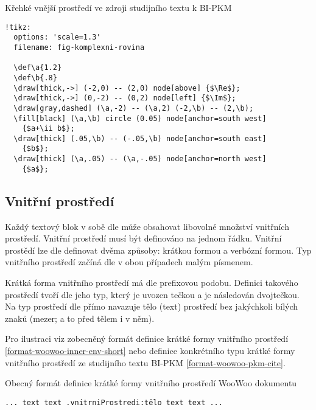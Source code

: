 \begin{listing}
    \caption{Křehké vnější prostředí ve zdroji studijního textu k BI-PKM~\cite{pkm}}
    \label{format-woowoo-pkm-tikz}
    \begin{verbatim}
!tikz:
  options: 'scale=1.3'
  filename: fig-komplexni-rovina

  \def\a{1.2}
  \def\b{.8}
  \draw[thick,->] (-2,0) -- (2,0) node[above] {$\Re$};
  \draw[thick,->] (0,-2) -- (0,2) node[left] {$\Im$};
  \draw[gray,dashed] (\a,-2) -- (\a,2) (-2,\b) -- (2,\b);
  \fill[black] (\a,\b) circle (0.05) node[anchor=south west]
    {$a+\ii b$};
  \draw[thick] (.05,\b) -- (-.05,\b) node[anchor=south east]
    {$b$};
  \draw[thick] (\a,.05) -- (\a,-.05) node[anchor=north west]
    {$a$};
    \end{verbatim}
\end{listing}

\subsection{Vnitřní prostředí}

Každý textový blok v sobě dle \cite{woowoo} může obsahovat libovolné množství vnitřních prostředí. Vnitřní prostředí
musí být definováno na jednom řádku. Vnitřní prostědí lze dle \cite{woowoo} definovat dvěma způsoby: krátkou formou a
verbózní formou. Typ vnitřního prostředí začíná dle \cite{woowoo} v obou případech malým písmenem.

Krátká forma vnitřního prostředí má dle \cite{woowoo} prefixovou podobu. Definici takového prostředí tvoří dle
\cite{woowoo} jeho typ, který je uvozen tečkou a je následován dvojtečkou. Na typ prostředí dle \cite{woowoo} přímo
navazuje tělo (text) prostředí bez jakýchkoli bílých znaků (mezer; a to před tělem i v něm).

Pro ilustraci viz zobecněný formát definice krátké formy vnitřního prostředí \ref{format-woowoo-inner-env-short} nebo
definice konkrétního typu krátké formy vnitřního prostředí ze studijního textu BI-PKM \ref{format-woowoo-pkm-cite}.

\begin{listing}
    \caption{Obecný formát definice krátké formy vnitřního prostředí WooWoo dokumentu}
    \label{format-woowoo-inner-env-short}
    \begin{verbatim}
... text text .vnitrniProstredi:tělo text text ...
    \end{verbatim}
\end{listing}


